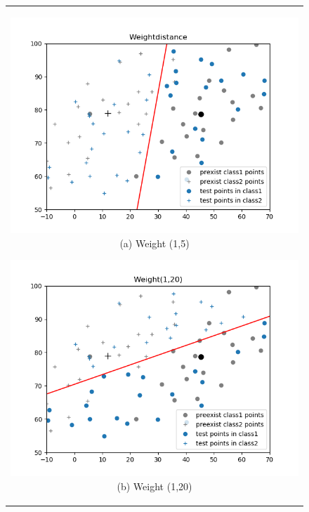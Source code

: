 \documentclass[10.5pt]{jsarticle}
\begin{document}
\begin{figure}[htbp]
  \centering
  \begin{tabular}{c}
   \begin{minipage}{0.56\hsize}
   \centering
     \includegraphics[width=15.0cm, bb=9 9 700 270]{results/WeightdistanceResultFigureA.png}
     \hspace{0cm} (a) Weight (1,5)
   \end{minipage}

   \begin{minipage}{0.5\hsize}
   \centering
     \includegraphics[width=15.0cm, bb=9 9 700 270]{results/Weight(1,20)ResultFigureA.png}
     \hspace{0cm} (b) Weight (1,20)
   \end{minipage}
  \end{tabular}
\end{figure}
\end{document}
